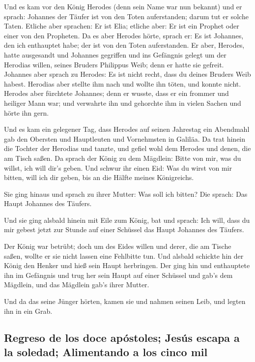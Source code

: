  Und es kam vor den König Herodes (denn sein Name war nun
bekannt) und er sprach: Johannes der Täufer ist von den Toten
auferstanden; darum tut er solche Taten.  Etliche aber
sprachen: Er ist Elia; etliche aber: Er ist ein Prophet oder einer von
den Propheten.  Da es aber Herodes hörte, sprach er: Es
ist Johannes, den ich enthauptet habe; der ist von den Toten
auferstanden.  Er aber, Herodes, hatte ausgesandt und
Johannes gegriffen und ins Gefängnis gelegt um der Herodias willen,
seines Bruders Philippus Weib; denn er hatte sie gefreit.
 Johannes aber sprach zu Herodes: Es ist nicht recht,
dass du deines Bruders Weib habest.  Herodias aber
stellte ihm nach und wollte ihn töten, und konnte nicht. 
Herodes aber fürchtete Johannes; denn er wusste, dass er ein frommer und
heiliger Mann war; und verwahrte ihn und gehorchte ihm in vielen Sachen
und hörte ihn gern.

 Und es kam ein gelegener Tag, dass Herodes auf seinen
Jahrestag ein Abendmahl gab den Obersten und Hauptleuten und Vornehmsten
in Galiläa.  Da trat hinein die Tochter der Herodias und
tanzte, und gefiel wohl dem Herodes und denen, die am Tisch saßen. Da
sprach der König zu dem Mägdlein: Bitte von mir, was du willst, ich will
dir's geben.  Und schwur ihr einen Eid: Was du wirst von
mir bitten, will ich dir geben, bis an die Hälfte meines Königreichs.

 Sie ging hinaus und sprach zu ihrer Mutter: Was soll ich
bitten? Die sprach: Das Haupt Johannes des Täufers.

 Und sie ging alsbald hinein mit Eile zum König, bat und
sprach: Ich will, dass du mir gebest jetzt zur Stunde auf einer Schüssel
das Haupt Johannes des Täufers.

 Der König war betrübt; doch um des Eides willen und
derer, die am Tische saßen, wollte er sie nicht lassen eine Fehlbitte
tun.  Und alsbald schickte hin der König den Henker und
hieß sein Haupt herbringen. Der ging hin und enthauptete ihn im
Gefängnis  und trug her sein Haupt auf einer Schüssel und
gab's dem Mägdlein, und das Mägdlein gab's ihrer Mutter.

 Und da das seine Jünger hörten, kamen sie und nahmen
seinen Leib, und legten ihn in ein Grab.

\hypertarget{regreso-de-los-doce-apuxf3stoles-jesuxfas-escapa-a-la-soledad-alimentando-a-los-cinco-mil}{%
\subsection{Regreso de los doce apóstoles; Jesús escapa a la soledad;
Alimentando a los cinco
mil}\label{regreso-de-los-doce-apuxf3stoles-jesuxfas-escapa-a-la-soledad-alimentando-a-los-cinco-mil}}

